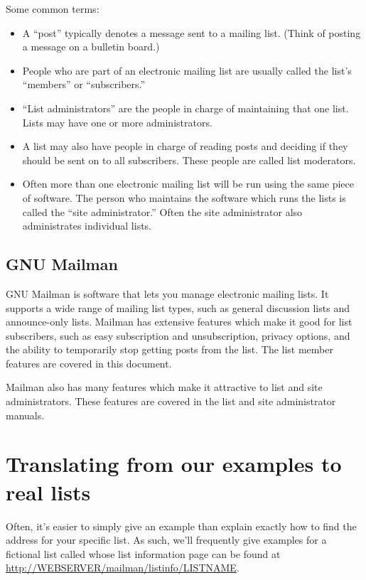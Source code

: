 \documentclass{howto}
\begin{document}
Some common terms:
\begin{itemize}
	\item A ``post'' typically denotes a message sent to a mailing list.  
	(Think of posting a message on a bulletin board.)
	\item People who are part of an electronic mailing list are usually called 
	the list's ``members'' or ``subscribers.''
	\item  ``List administrators'' are the people in charge of maintaining that 
	one list.  Lists may have one or more administrators.
	\item A list may also have people in charge of reading posts and deciding
	if they should be sent on to all subscribers.  These people are called
	list moderators.
	\item Often more than one electronic mailing list will be run using the same
	piece of software.  The person who maintains the software which runs
	the lists is called the ``site administrator.''  Often the site administrator
	also administrates individual lists.
\end{itemize}
\subsection{GNU Mailman}

GNU Mailman is software that lets you manage electronic mailing lists. It
supports a wide range of mailing list types, such as general discussion
lists and announce-only lists.  Mailman has extensive features which make it
good for list subscribers, such as easy subscription and unsubscription, 
privacy options, and the ability to temporarily stop getting posts from the 
list.  The list member features are covered in this document.

Mailman also has many features which make it attractive to list and site 
administrators.  These features are covered in the list and site administrator
manuals.

\section{Translating from our examples to real lists}

Often, it's easier to simply give an example than explain exactly how
to find the address for your specific list.  As such, we'll frequently 
give examples for a fictional list called 
 whose list information page can be found at
\url{http://WEBSERVER/mailman/listinfo/LISTNAME}.  
\end{document}
